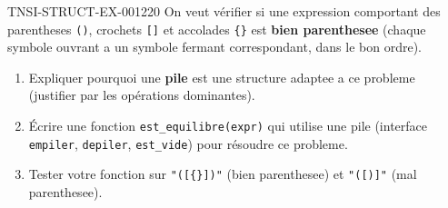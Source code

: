 \begin{exercice}{TNSI-STRUCT-EX-001}{2}{20}
On veut vérifier si une expression comportant des parentheses \lstinline{()}, crochets \lstinline{[]} et accolades \lstinline|{}| est \textbf{bien parenthesee} (chaque symbole ouvrant a un symbole fermant correspondant, dans le bon ordre).
\begin{enumerate}
  \item Expliquer pourquoi une \textbf{pile} est une structure adaptee a ce probleme (justifier par les opérations dominantes).
  \item Écrire une fonction \lstinline{est_equilibre(expr)} qui utilise une pile (interface \lstinline{empiler}, \lstinline{depiler}, \lstinline{est_vide}) pour résoudre ce probleme.
  \item Tester votre fonction sur \lstinline|"([{}])"| (bien parenthesee) et \lstinline{"([)]"} (mal parenthesee).
\end{enumerate}
\end{exercice}
